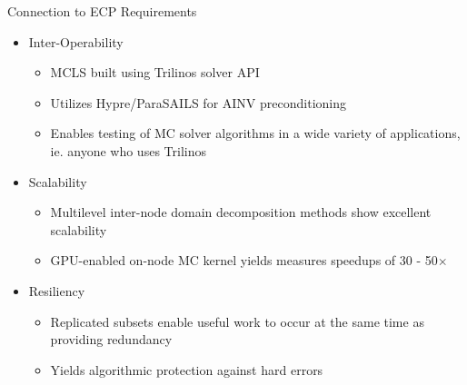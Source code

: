 \documentclass{beamer}
\begin{document}
\begin{frame}{Connection to ECP Requirements}

  \begin{itemize}

  \item Inter-Operability
    \begin{itemize}
    \item MCLS built using Trilinos solver API
    \item Utilizes Hypre/ParaSAILS for AINV preconditioning
    \item Enables testing of MC solver algorithms in a wide variety of
      applications, ie. anyone who uses Trilinos
    \end{itemize}

  \item Scalability
    \begin{itemize}
    \item Multilevel inter-node domain decomposition methods show excellent
      scalability
    \item GPU-enabled on-node MC kernel yields measures speedups of 30 -
      50$\times$
    \end{itemize}

  \item Resiliency
    \begin{itemize}
    \item Replicated subsets enable useful work to occur at the same time as
      providing redundancy
    \item Yields algorithmic protection against hard errors
    \end{itemize}
  \end{itemize}

\end{frame}

\end{document}
